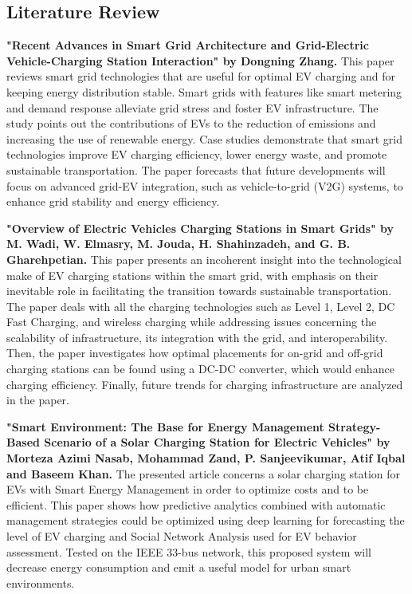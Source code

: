 \documentclass[12pt]{report}
\begin{document}
\begin{Certificatepage}
\begin{center}
\begin{justify}
\vspace{10pt}
\section{Literature Review}
\label{litrew}
\textbf{"Recent Advances in Smart Grid Architecture and Grid-Electric Vehicle-Charging Station Interaction" by Dongning Zhang.} This paper reviews smart grid technologies that are useful for optimal EV charging and for keeping energy distribution stable. Smart grids with features like smart metering and demand response alleviate grid stress and foster EV infrastructure. The study points out the contributions of EVs to the reduction of emissions and increasing the use of renewable energy. Case studies demonstrate that smart grid technologies improve EV charging efficiency, lower energy waste, and promote sustainable transportation. The paper 
forecasts that future developments will focus on advanced grid-EV integration, such as vehicle-to-grid (V2G) systems, to enhance 
grid stability and energy efficiency. 

\vspace{10pt}
\textbf{"Overview of Electric Vehicles Charging Stations in Smart Grids" by M. Wadi, W. Elmasry, M. Jouda, H. Shahinzadeh, and G. B. 
Gharehpetian.} This paper presents an incoherent insight into the technological make of EV charging stations within the smart grid, 
with emphasis on their inevitable role in facilitating the transition towards sustainable transportation. The paper deals with all the 
charging technologies such as Level 1, Level 2, DC Fast Charging, and wireless charging while addressing issues concerning the 
scalability of infrastructure, its integration with the grid, and interoperability. Then, the paper investigates how optimal placements 
for on-grid and off-grid charging stations can be found using a DC-DC converter, which would enhance charging efficiency. Finally, 
future trends for charging infrastructure are analyzed in the paper. 

\vspace{10pt}
\textbf{"Smart Environment: The Base for Energy Management Strategy-Based Scenario of a Solar Charging Station for Electric Vehicles" 
by Morteza Azimi Nasab, Mohammad Zand, P. Sanjeevikumar, Atif Iqbal and Baseem Khan.} The presented article concerns a solar 
charging station for EVs with Smart Energy Management in order to optimize costs and to be efficient. This paper shows how 
predictive analytics combined with automatic management strategies could be optimized using deep learning for forecasting the 
level of EV charging and Social Network Analysis used for EV behavior assessment. Tested on the IEEE 33-bus network, this 
proposed system will decrease energy consumption and emit a useful model for urban smart environments.


\end{justify}
\end{center}
\end{Certificatepage}
\end{document}
